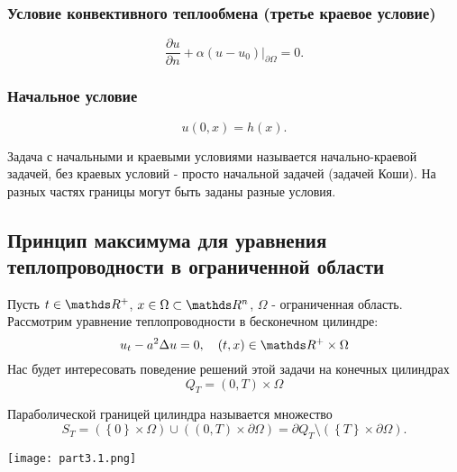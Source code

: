 \subsubsection{Условие конвективного теплообмена (третье краевое условие)}
$$ \frac {\partial u} {\partial n} + \alpha (u - u_0) \Bigg\rvert_{\partial \Omega} = 0.$$

\subsubsection{Начальное условие}
$$ u(0, x) = h(x).$$


Задача с начальными и краевыми условиями называется начально-краевой задачей, без краевых условий - просто начальной задачей (задачей Коши). На разных частях границы могут быть заданы разные условия.

\subsection{Принцип максимума для уравнения теплопроводности в ограниченной области}
Пусть $t \in \real^+$, $x \in \Omega \subset \real^n$, $\Omega$ - ограниченная область. Рассмотрим уравнение теплопроводности в бесконечном цилиндре: $$ u_t - a^2 \Delta u = 0, \quad  (t,x) \in \real^+ \times \Omega$$
Нас будет интересовать поведение решений этой задачи на конечных цилиндрах $$ Q_T = (0, T) \times \Omega $$

\begin{definition}
Параболической границей цилиндра называется множество
$$ S_T = (\left\{ 0 \right\} \times \Omega) \cup ((0,T) \times \partial \Omega) = \partial Q_T \setminus (\left\{ T \right\} \times \partial \Omega) .$$
\end{definition}

\begin{center}
\texttt{[image: part3.1.png]}
\end{center}

